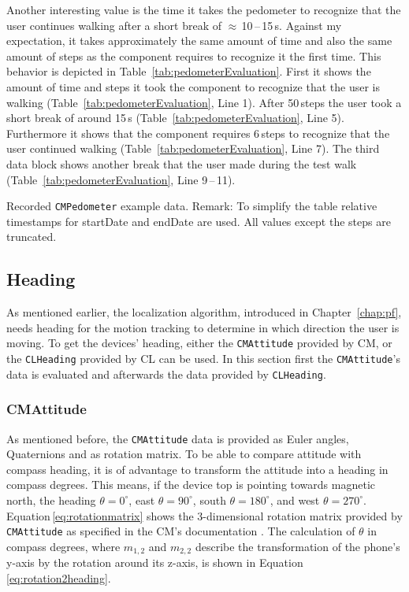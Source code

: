 Another interesting value is the time it takes the pedometer to recognize that the user continues walking after a short break of $\approx$\,10\,--\,15\,s. Against my expectation, it takes approximately the same amount of time and also the same amount of steps as the component requires to recognize it the first time. This behavior is depicted in Table~\ref{tab:pedometerEvaluation}. First it shows the amount of time and steps it took the component to recognize that the user is walking (Table~\ref{tab:pedometerEvaluation}, Line 1). After 50\,steps the user took a short break of around 15\,s (Table~\ref{tab:pedometerEvaluation}, Line 5). Furthermore it shows that the component requires 6\,steps to recognize that the user continued walking (Table~\ref{tab:pedometerEvaluation}, Line 7). The third data block shows another break that the user made during the test walk (Table~\ref{tab:pedometerEvaluation}, Line 9\,--\,11).

\begin{table}
	
	\caption{Recorded \texttt{CMPedometer} example data. Remark: To simplify the table relative timestamps for startDate and endDate are used. All values except the steps are truncated.}
	\label{tab:pedometerEvaluation}
\end{table}


\subsection{Heading}
As mentioned earlier, the localization algorithm, introduced in Chapter~\ref{chap:pf}, needs heading for the motion tracking to determine in which direction the user is moving. To get the devices' heading, either the \texttt{CMAttitude} provided by \ac{CM}, or the \texttt{CLHeading} provided by \ac{CL} can be used. In this section first the \texttt{CMAttitude}'s data is evaluated and afterwards the data provided by \texttt{CLHeading}.

\subsubsection*{CMAttitude}
As mentioned before, the \texttt{CMAttitude} data is provided as Euler angles, Quaternions and as rotation matrix. To be able to compare attitude with compass heading, it is of advantage to transform the attitude into a heading in compass degrees. This means, if the device top is pointing towards magnetic north, the heading $\theta = 0^{\circ}$, east $\theta = 90^{\circ}$, south $\theta = 180^{\circ}$, and west $\theta = 270^{\circ}$. Equation\,\ref{eq:rotationmatrix} shows the 3-dimensional rotation matrix provided by \texttt{CMAttitude} as specified in the \ac{CM}'s documentation \citep{apple:ios_doc_cm}. The calculation of $\theta$ in compass degrees, where $m_{1,2}$ and $m_{2,2}$ describe the transformation of the phone's y-axis by the rotation around its z-axis, is shown in Equation\,\ref{eq:rotation2heading}.

